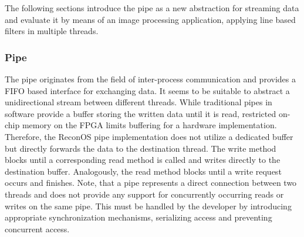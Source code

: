 The following sections introduce the pipe as a new abstraction for streaming
data and evaluate it by means of an image processing application, applying
line based filters in multiple threads.

\subsubsection{Pipe}
The pipe originates from the field of inter-process communication and provides
a \ac{FIFO} based interface for exchanging data. It seems to be suitable to
abstract a unidirectional stream between different threads. While traditional
pipes in software provide a buffer storing the written data until it is read,
restricted on-chip memory on the \ac{FPGA} limits buffering for a hardware
implementation. Therefore, the ReconOS pipe implementation does not utilize a
dedicated buffer but directly forwards the data to the destination thread. The
write method blocks until a corresponding read method is called and writes
directly to the destination buffer. Analogously, the read method blocks until
a write request occurs and finishes. Note, that a pipe represents a direct
connection between two threads and does not provide any support for
concurrently occurring reads or writes on the same pipe. This must be handled
by the developer by introducing appropriate synchronization mechanisms,
serializing access and preventing concurrent access.

